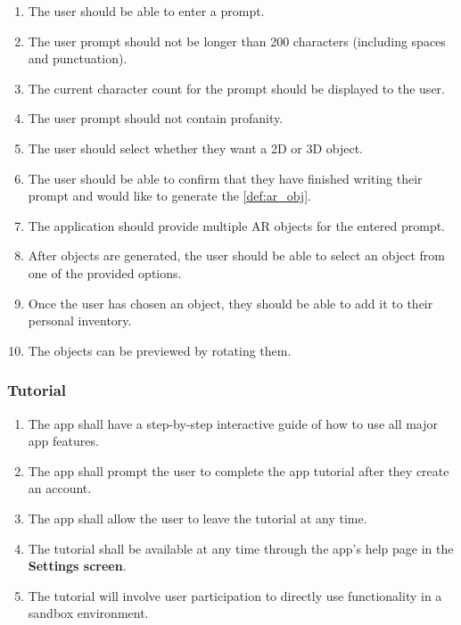 \documentclass{article}
\begin{document}
\begin{enumerate}[align=left, label=\textbf{POG-FR\arabic*:}]
    \item The user should be able to enter a prompt.
    \item The user prompt should not be longer than 200 characters (including spaces and punctuation).
    \item The current character count for the prompt should be displayed to the user.
    \item The user prompt should not contain profanity.
    \item The user should select whether they want a 2D or 3D object.
    \item The user should be able to confirm that they have finished writing their prompt and would like to generate the \ref{def:ar_obj}.
    \item The application should provide multiple AR objects for the entered prompt.
    \item After objects are generated, the user should be able to select an object from one of the provided options.
    \item Once the user has chosen an object, they should be able to add it to their personal inventory.
    \item The objects can be previewed by rotating them.
\end{enumerate}

\subsubsection{Tutorial}
\label{ssub:tutorial}

\begin{enumerate}[align=left, label=\textbf{TU-FR\arabic*:}]
    \item The app shall have a step-by-step interactive guide of how to use all major app features.
    \item The app shall prompt the user to complete the app tutorial after they create an account.
    \item The app shall allow the user to leave the tutorial at any time.
    \item The tutorial shall be available at any time through the app's help page in the \textbf{Settings screen}.
    \item The tutorial will involve user participation to directly use functionality in a sandbox environment.
\end{enumerate}
\end{document}
